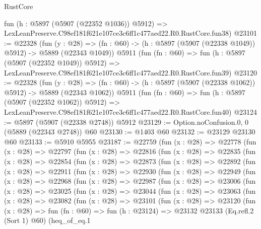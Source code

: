 \begin{lexlean}{RustCore}
\begin{coremodule}
    fun (h : @5897 (@5907 (@22352 @1036)) @5912) =>
    LexLeanPreserve.C98ef181f621e107ce3c6ff1c477aed22.R0.RustCore.fun38)
@23101 := @22328
    (fun (y : @28) =>
    (fn : @60) -> (h : @5897 (@5907 (@22338 @1049)) @5912) -> @5889 (@22343 @1049))
    @5911
    (fun (fn : @60) =>
    fun (h : @5897 (@5907 (@22352 @1049)) @5912) =>
    LexLeanPreserve.C98ef181f621e107ce3c6ff1c477aed22.R0.RustCore.fun39)
@23120 := @22328
    (fun (y : @28) =>
    (fn : @60) -> (h : @5897 (@5907 (@22338 @1062)) @5912) -> @5889 (@22343 @1062))
    @5911
    (fun (fn : @60) =>
    fun (h : @5897 (@5907 (@22352 @1062)) @5912) =>
    LexLeanPreserve.C98ef181f621e107ce3c6ff1c477aed22.R0.RustCore.fun40)
@23124 := @5897 (@5907 (@22338 @2748)) @5912
@23129 := Option.noConfusion.{0, 0} (@5889 (@22343 @2748)) @60
@23130 := @1403 @60
@23132 := @23129 @23130 @60
@23133 := @5910 @5955
@23187 := @22759
    (fun (x : @28) =>
    @22778
      (fun (x : @28) =>
      @22797
        (fun (x : @28) =>
        @22816
          (fun (x : @28) =>
          @22835
            (fun (x : @28) =>
            @22854
              (fun (x : @28) =>
              @22873
                (fun (x : @28) =>
                @22892
                  (fun (x : @28) =>
                  @22911
                    (fun (x : @28) =>
                    @22930
                      (fun (x : @28) =>
                      @22949
                        (fun (x : @28) =>
                        @22968
                          (fun (x : @28) =>
                          @22987
                            (fun (x : @28) =>
                            @23006
                              (fun (x : @28) =>
                              @23025
                                (fun (x : @28) =>
                                @23044
                                  (fun (x : @28) =>
                                  @23063
                                    (fun (x : @28) =>
                                    @23082
                                      (fun (x : @28) =>
                                      @23101
                                        (fun (x : @28) =>
                                        @23120
                                          (fun (x : @28) =>
                                          fun (fn : @60) =>
                                          fun (h : @23124) =>
                                          @23132
                                            @23133
                                            (Eq.refl.{2} (Sort 1) @60)
                                            (heq_of_eq.{1}

\end{coremodule}
\end{lexlean}
